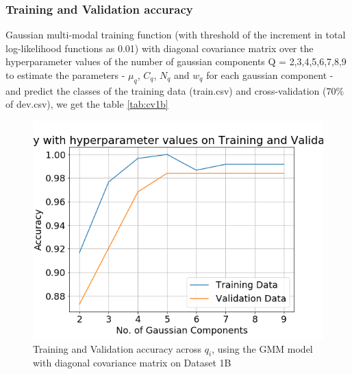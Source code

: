 \documentclass[11pt,a4paper]{article}
\begin{document}
\subsubsection{Training and Validation accuracy}
Gaussian multi-modal training function (with threshold of the increment in total log-likelihood functions as 0.01) with diagonal covariance matrix over the hyperparameter values of the number of gaussian components Q = {2,3,4,5,6,7,8,9} to estimate the parameters - $\mu_q$, $C_q$, $N_q$ and $w_q$ for each gaussian component - and predict the classes of the training data (train.csv) and cross-validation (70\% of dev.csv), we get the table \ref{tab:cv1b}

\begin{figure}[H]
    \centering
    \includegraphics[scale=0.5]{images/acc_1b.png}
    \caption{Training and Validation accuracy across $q_i$, using the GMM model with diagonal covariance matrix on Dataset 1B}
    \label{fig:acc1bGMMdiag}
\end{figure}
\end{document}
